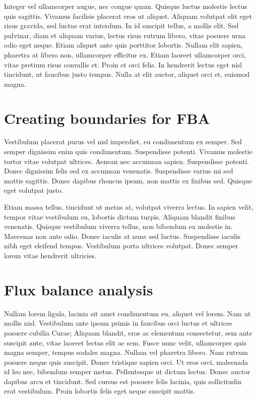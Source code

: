 \documentclass[parskip=full]{scrreprt}
\begin{document}
Integer vel ullamcorper augue, nec congue quam. Quisque luctus molestie lectus quis sagittis. Vivamus facilisis placerat eros ut aliquet. Aliquam volutpat elit eget risus gravida, sed luctus erat interdum. In id suscipit tellus, a mollis elit. Sed pulvinar, diam et aliquam varius, lectus risus rutrum libero, vitae posuere urna odio eget neque. Etiam aliquet ante quis porttitor lobortis. Nullam elit sapien, pharetra at libero non, ullamcorper efficitur ex. Etiam laoreet ullamcorper orci, vitae pretium risus convallis et. Proin et orci felis. In hendrerit lectus eget nisl tincidunt, ut faucibus justo tempus. Nulla at elit auctor, aliquet orci et, euismod magna.

\section{Creating boundaries for FBA}
\label{sec:bounds}

Vestibulum placerat purus vel nisl imperdiet, eu condimentum ex semper. Sed semper dignissim enim quis condimentum. Suspendisse potenti. Vivamus molestie tortor vitae volutpat ultrices. Aenean nec accumsan sapien. Suspendisse potenti. Donec dignissim felis sed ex accumsan venenatis. Suspendisse varius mi sed mattis sagittis. Donec dapibus rhoncus ipsum, non mattis ex finibus sed. Quisque eget volutpat justo.

Etiam massa tellus, tincidunt ut metus at, volutpat viverra lectus. In sapien velit, tempor vitae vestibulum eu, lobortis dictum turpis. Aliquam blandit finibus venenatis. Quisque vestibulum viverra tellus, non bibendum ex molestie in. Maecenas non ante odio. Donec iaculis at nunc sed luctus. Suspendisse iaculis nibh eget eleifend tempus. Vestibulum porta ultrices volutpat. Donec semper lorem vitae hendrerit ultricies.

\section{Flux balance analysis}
\label{sec:fba}

Nullam lorem ligula, lacinia sit amet condimentum eu, aliquet vel lorem. Nam ut mollis nisl. Vestibulum ante ipsum primis in faucibus orci luctus et ultrices posuere cubilia Curae; Aliquam blandit, eros ac elementum consectetur, sem ante suscipit ante, vitae laoreet lectus elit ac sem. Fusce nunc velit, ullamcorper quis magna semper, tempus sodales magna. Nullam vel pharetra libero. Nam rutrum posuere neque quis suscipit. Donec tristique sapien orci. Ut eros orci, malesuada id leo nec, bibendum semper metus. Pellentesque ut dictum lectus. Donec auctor dapibus arcu et tincidunt. Sed cursus est posuere felis lacinia, quis sollicitudin erat vestibulum. Proin lobortis felis eget neque suscipit mattis.
\end{document}
